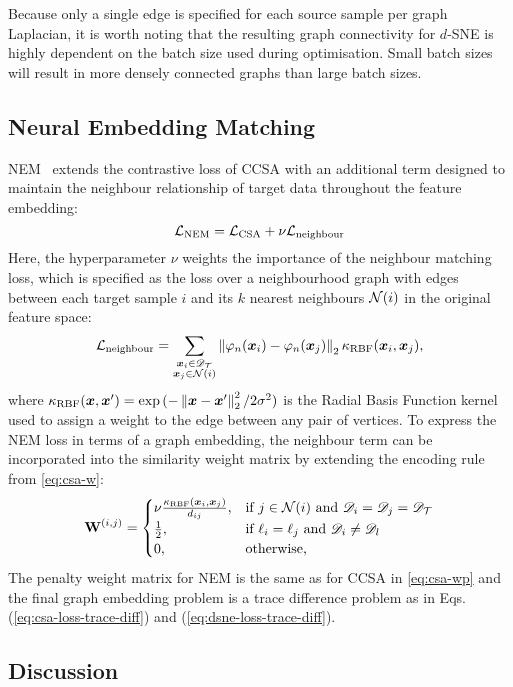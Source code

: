 \documentclass[journal]{IEEEtran}
\renewcommand{\vector}[1]{\ensuremath{\bm{\lowercase{#1}}}}
\renewcommand{\matrix}[1]{\ensuremath{\bm{\mathbf{\uppercase{#1}}}}}
\newcommand{\vx}{\vector{x}}
\newcommand{\Domain}{\mathscr{D}} \newcommand{\Task}{\mathscr{T}} \newcommand{\concept}[1]{\ensuremath{\mathcal{\uppercase{#1}}}}
\newcommand{\norm}[1]{\ensuremath{\left\|#1 \right\|}}
\begin{document}
Because only a single edge is specified for each source sample per graph Laplacian, it is worth noting that the resulting graph connectivity for $d$-SNE is highly dependent on the batch size used during optimisation. Small batch sizes will result in more densely connected graphs than large batch sizes.




\subsection{Neural Embedding Matching} \label{sec:dage-nem}
NEM~\cite{wang2019nem} extends the contrastive loss of CCSA with an additional term designed to maintain the neighbour relationship of target data throughout the feature embedding:
\begin{equation}\label{eq:nem-loss-total}
\concept{L}_{\text{NEM}} = \concept{L}_{\text{CSA}} + \nu \concept{L}_{\text{neighbour}} 
\end{equation}
Here, the hyperparameter $\nu$ weights the importance of the neighbour matching loss, which is specified as the loss over a neighbourhood graph with edges between each target sample $i$ and its $k$ nearest neighbours $\concept{N}(i)$ in the original feature space: 
\begin{equation}\label{eq:nem-loss-neighbour}
\concept{L}_{\text{neighbour}}
= 
    \sum_{\substack{
        \vx_i \in \Domain_\Tgt \\
        \vx_j \in \concept{N}(i)
    }}
    \norm{\varphi_n(\vx_i)-\varphi_n(\vx_j)}_2 \kappa_{\text{RBF}}(\vx_i, \vx_j),
\end{equation}
where 
$\kappa_{\text{RBF}}(\vx, \vx' ) = \exp{( -\norm{\vx-\vx'}_2^2 / 2\sigma^2 )}$ is the Radial Basis Function kernel used to assign a weight to the edge between any pair of vertices.
To express the NEM loss in terms of a graph embedding, the neighbour term can be incorporated into the similarity weight matrix by extending the encoding rule from \cref{eq:csa-w}:
\begin{equation} \label{eq:nem-w}
\matrix{W}^{(i,j)} = 
    \begin{cases}
\nu \frac{ \kappa_{\text{RBF}}(\vx_i, \vx_j )}{d_{ij}}, 
            & \text{if } j \in \concept{N}(i) \text{ and } \Domain_i = \Domain_j = \Domain_\Tgt \\
        \frac{1}{2}, 
            & \text{if } \ell_i = \ell_j \text{ and } \Domain_i \neq \Domain_l \\
        0,  & \text{otherwise, } \\
    \end{cases}
\end{equation}
The penalty weight matrix for NEM is the same as for CCSA in \cref{eq:csa-wp} and the final graph embedding problem is a trace difference problem as in Eqs. (\ref{eq:csa-loss-trace-diff}) and (\ref{eq:dsne-loss-trace-diff}). \subsection{Discussion} \label{sec:discussion}
\end{document}
